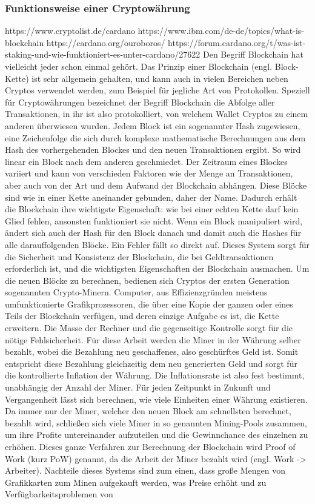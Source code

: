 \documentclass[12pt]{article}
\begin{document}
	\subsubsection{Funktionsweise einer Cryptowährung}
		https://www.cryptolist.de/cardano
		https://www.ibm.com/de-de/topics/what-is-blockchain
		https://cardano.org/ouroboros/
		https://forum.cardano.org/t/was-ist-staking-und-wie-funktioniert-es-unter-cardano/27622
		Den Begriff Blockchain hat vielleicht jeder schon einmal gehört. Das Prinzip einer Blockchain (engl. Block-Kette) ist sehr allgemein gehalten, und kann auch in vielen Bereichen neben Cryptos verwendet werden, zum Beispiel für jegliche Art von Protokollen. Speziell für Cryptowährungen bezeichnet der Begriff Blockchain die Abfolge aller Transaktionen, in ihr ist also protokolliert, von welchem Wallet Cryptos zu einem anderen überwiesen wurden. Jedem Block ist ein sogenannter Hash zugewiesen, eine Zeichenfolge die sich durch komplexe mathematische Berechnungen aus dem Hash des vorhergehenden Blockes und den neuen Transaktionen ergibt. So wird linear ein Block nach dem anderen geschmiedet. Der Zeitraum eines Blockes variiert und kann von verschieden Faktoren wie der Menge an Transaktionen, aber auch von der Art und dem Aufwand der Blockchain abhängen. Diese Blöcke sind wie in einer Kette aneinander gebunden, daher der Name. Dadurch erhält die Blockchain ihre wichtigste Eigenschaft: wie bei einer echten Kette darf kein Glied fehlen, ansonsten funktioniert sie nicht. Wenn ein Block manipuliert wird, ändert sich auch der Hash für den Block danach und damit auch die Hashes für alle darauffolgenden Blöcke. Ein Fehler fällt so direkt auf. Dieses System sorgt für die Sicherheit und Konsistenz der Blockchain, die bei Geldtransaktionen erforderlich ist, und die wichtigsten Eigenschaften der Blockchain ausmachen. Um die neuen Blöcke zu berechnen, bedienen sich Cryptos der ersten Generation sogenannten Crypto-Minern. Computer, aus Effizienzgründen meistens umfunktionierte Grafikprozessoren, die über eine Kopie der ganzen oder eines Teils der Blockchain verfügen, und deren einzige Aufgabe es ist, die Kette erweitern. Die Masse der Rechner und die gegenseitige Kontrolle sorgt für die nötige Fehlsicherheit. Für diese Arbeit werden die Miner in der Währung selber bezahlt, wobei die Bezahlung neu geschaffenes, also \glqq geschürftes\grqq{} Geld ist. Somit entspricht diese Bezahlung gleichzeitig dem neu generierten Geld und sorgt für die kontrollierte Inflation der Währung. Die Inflationsrate ist also fest bestimmt, unabhängig der Anzahl der Miner. Für jeden Zeitpunkt in Zukunft und Vergangenheit lässt sich berechnen, wie viele Einheiten einer Währung existieren. Da immer nur der Miner, welcher den neuen Block am schnellsten berechnet, bezahlt wird, schließen sich viele Miner in so genannten Mining-Pools zusammen, um ihre Profite untereinander aufzuteilen und die Gewinnchance des einzelnen zu erhöhen. Dieses ganze Verfahren zur Berechnung der Blockchain wird \glqq Proof of Work\grqq{} (kurz PoW) genannt, da die Arbeit der Miner bezahlt wird (engl. Work -> Arbeiter). Nachteile dieses Systems sind zum einen, dass große Mengen von Grafikkarten zum Minen aufgekauft werden, was Preise erhöht und zu Verfügbarkeitsproblemen von 
\end{document}
